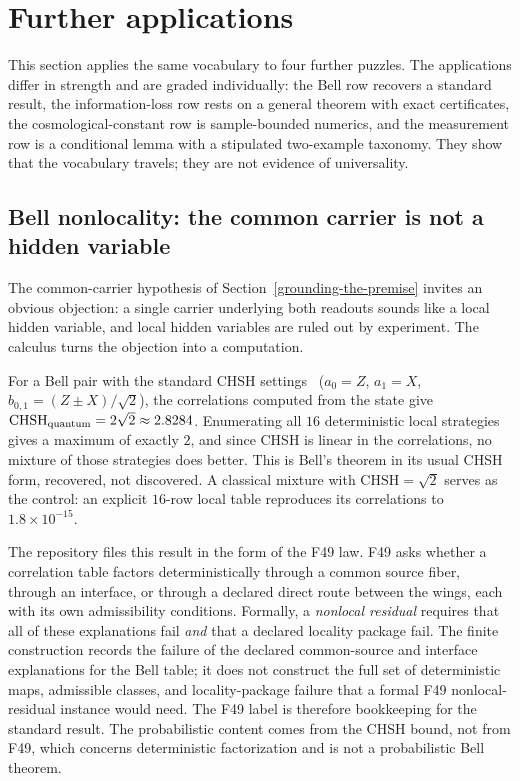 \section{Further applications}\label{breadth-one-calculus-three-more-deep-problems}

This section applies the same vocabulary to four further puzzles. The applications differ in strength and are graded
individually: the Bell row recovers a standard result, the information-loss row rests on a general theorem with exact
certificates, the cosmological-constant row is sample-bounded numerics, and the measurement row is a conditional lemma
with a stipulated two-example taxonomy. They show that the vocabulary travels; they are not evidence of universality.

\subsection{Bell nonlocality: the common carrier is not a hidden variable}\label{bell-nonlocality-the-common-carrier-is-not-a-hidden-variable}

The common-carrier hypothesis of Section~\ref{grounding-the-premise} invites an obvious objection: a single carrier
underlying both readouts sounds like a local hidden variable, and local hidden variables are ruled out by
experiment. The calculus turns the objection into a computation.

For a Bell pair with the standard CHSH settings~\citep{Bell1964,CHSH1969} (\(a_0=Z\), \(a_1=X\),
\(b_{0,1}=(Z\pm X)/\sqrt2\)), the correlations computed from the state give
\(\mathrm{CHSH}_{\rm quantum}=2\sqrt2\approx2.8284\). Enumerating all \(16\) deterministic local strategies gives a
maximum of exactly \(2\), and since CHSH is linear in the correlations, no mixture of those strategies does better. This
is Bell's theorem in its usual CHSH form, recovered, not discovered. A classical mixture with
\(\mathrm{CHSH}=\sqrt2\) serves as the control: an explicit \(16\)-row local table reproduces its correlations to
\(1.8\times10^{-15}\).

The repository files this result in the form of the F49 law. F49 asks whether a correlation table factors
deterministically through a common source fiber, through an interface, or through a declared direct route between the
wings, each with its own admissibility conditions. Formally, a \emph{nonlocal residual} requires that all of these
explanations fail \emph{and} that a declared locality package fail. The finite construction records the failure of
the declared common-source and interface explanations for the Bell table; it does not construct the full set of
deterministic maps, admissible classes, and locality-package failure that a formal F49 nonlocal-residual instance
would need. The F49 label is therefore bookkeeping for the standard result. The probabilistic content comes from the
CHSH bound, not from F49, which concerns deterministic factorization and is not a probabilistic Bell theorem.

